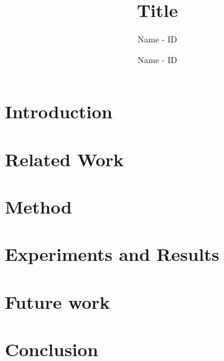 \documentclass{acmart}
\title{Title}
\author{Name - ID}
\author{Name - ID}
\date{}
\begin{document}
\begin{abstract}

\end{abstract}
\maketitle

\section{Introduction}


\section{Related Work}



\section{Method}




\section{Experiments and Results}



\section{Future work}


\section{Conclusion}




\end{document}
